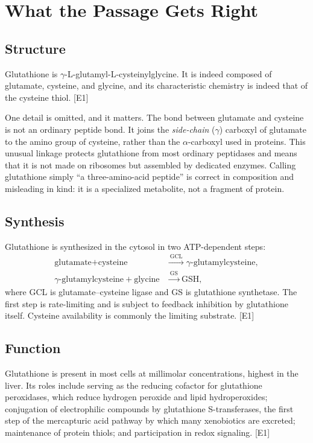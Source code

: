 \documentclass[11pt,a4paper]{article}
\theoremstyle{plain}
\theoremstyle{definition}
\theoremstyle{remark}
\newcommand{\tier}[1]{\textup{\textsc{[#1]}}}
\newcommand{\Eone}{\tier{E1}}
\newcommand{\GSH}{\mathrm{GSH}}
\begin{document}
\section{What the Passage Gets Right}

\subsection{Structure}

Glutathione is $\gamma$-L-glutamyl-L-cysteinylglycine. It is indeed composed of glutamate, cysteine, and glycine, and its characteristic chemistry is indeed that of the cysteine thiol. \Eone

One detail is omitted, and it matters. The bond between glutamate and cysteine is not an ordinary peptide bond. It joins the \emph{side-chain} ($\gamma$) carboxyl of glutamate to the amino group of cysteine, rather than the $\alpha$-carboxyl used in proteins. This unusual linkage protects glutathione from most ordinary peptidases and means that it is not made on ribosomes but assembled by dedicated enzymes. Calling glutathione simply ``a three-amino-acid peptide'' is correct in composition and misleading in kind: it is a specialized metabolite, not a fragment of protein.

\subsection{Synthesis}

Glutathione is synthesized in the cytosol in two ATP-dependent steps:
\begin{align*}
\text{glutamate} + \text{cysteine} &\xrightarrow{\ \text{GCL}\ } \gamma\text{-glutamylcysteine},\\
\gamma\text{-glutamylcysteine} + \text{glycine} &\xrightarrow{\ \text{GS}\ } \GSH,
\end{align*}
where GCL is glutamate--cysteine ligase and GS is glutathione synthetase. The first step is rate-limiting and is subject to feedback inhibition by glutathione itself. Cysteine availability is commonly the limiting substrate. \Eone

\subsection{Function}

Glutathione is present in most cells at millimolar concentrations, highest in the liver. Its roles include serving as the reducing cofactor for glutathione peroxidases, which reduce hydrogen peroxide and lipid hydroperoxides; conjugation of electrophilic compounds by glutathione S-transferases, the first step of the mercapturic acid pathway by which many xenobiotics are excreted; maintenance of protein thiols; and participation in redox signaling. \Eone
\end{document}
